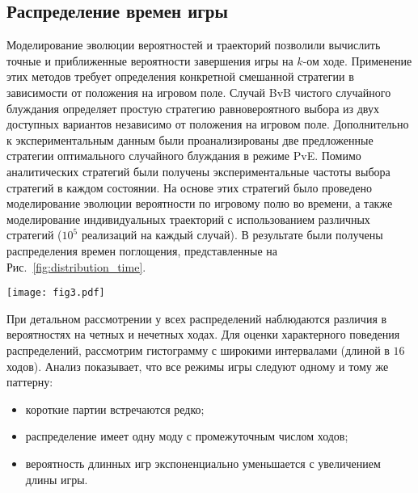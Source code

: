 \subsection{Распределение времен игры}\label{subsec:ch3/sec4/sub3}

Моделирование эволюции вероятностей и траекторий позволили вычислить точные и приближенные вероятности завершения игры на $k$-ом ходе. 
Применение этих методов требует определения конкретной смешанной стратегии в зависимости от положения на игровом поле. 
Случай BvB чистого случайного блуждания определяет простую стратегию равновероятного выбора из двух доступных вариантов независимо от положения на игровом поле. 
Дополнительно к экспериментальным данным были проанализированы две предложенные стратегии оптимального случайного блуждания в режиме PvE. 
Помимо аналитических стратегий были получены экспериментальные частоты выбора стратегий в каждом состоянии. 
На основе этих стратегий было проведено моделирование эволюции вероятности по игровому полю во времени, 
а также моделирование индивидуальных траекторий с использованием различных стратегий ($10^5$ реализаций на каждый случай). 
В результате были получены распределения времен поглощения, представленные на Рис.~\cref{fig:distribution_time}.

\begin{figure*}[t]
    \centering
    \texttt{[image: fig3.pdf]}
    \caption{
        Распределение количества ходов, полученное моделированием эволюции вероятности (сплошная линия) и численным моделированием (точки) 
        с использованием соответствующих стратегий игроков A и B. 
        Режим BvB (красная линия) представляет собой равновероятный выбор для обоих игроков. Кривые PvE (зеленый и синий) и PvP-режим (фиолетовая линия) 
        были построены на основе соответствующих усредненных стратегий по популяции. Противоположная стратегия в режиме PvE -- это стратегия равновероятного выбора. 
        Оптимальная стратегия для режима PvE в центре (зеленая пунктирная линия) -- держать фишку на диагональной лестнице. Оптимальная стратегия для режима границы PvE 
        (синяя пунктирная линия) -- выбирать движения только вдоль горизонтальной линии. Гистограммы, полученные экспериментально, представлены для режимов PvE 
        (зеленая и синяя области).
    }  
    \label{fig:distribution_time}
    
\end{figure*}

При детальном рассмотрении у всех распределений наблюдаются различия в вероятностях на четных и нечетных ходах. Для оценки характерного поведения распределений, рассмотрим гистограмму с широкими интервалами (длиной в $16$ ходов). Анализ показывает, что все режимы игры следуют одному и тому же паттерну:
\begin{itemize}
\item короткие партии встречаются редко;
\item распределение имеет одну моду с промежуточным числом ходов;
\item вероятность длинных игр экспоненциально уменьшается с увеличением длины игры.
\end{itemize}

